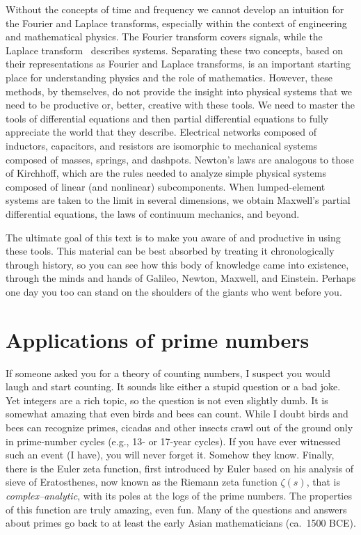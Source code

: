 \documentclass{ximera}
\begin{document}
Without the concepts of time and frequency we cannot develop an intuition for the Fourier and Laplace
transforms, especially within the context of engineering and mathematical physics.
The Fourier transform covers signals, while the Laplace transform \LT\ describes systems. Separating these
two concepts, based on their representations as Fourier and Laplace transforms, is an important
starting place for understanding physics and the role of mathematics. However, these methods, by
themselves, do not provide the insight into physical systems that we need to be productive or, better,
creative with these tools. We need to master the tools of differential equations and then partial
differential equations to fully appreciate the world that they describe. Electrical 
networks composed of inductors, capacitors, and resistors are isomorphic to mechanical systems
composed of masses, springs, and dashpots. Newton's laws are analogous to those of Kirchhoff,
which are the rules needed to analyze simple physical systems composed of linear (and nonlinear)
subcomponents. When lumped-element systems are taken to the limit in several dimensions, we obtain
Maxwell's partial differential equations, the laws of continuum mechanics, and beyond.

The ultimate goal of this text is to make you aware of and productive in using these tools.
This material can be best absorbed by treating it chronologically through history, so you
can see how this body of knowledge came into existence, through the minds and hands of Galileo,
Newton, Maxwell, and Einstein. Perhaps one day you too can stand on the shoulders of the giants who
went before you.

\section {Applications of prime numbers \label{Lec 4}}

If someone asked you for a theory of counting numbers, I suspect you would laugh and start counting.
It sounds like either a stupid question or a bad joke.  Yet integers are a rich topic, so the question
is not even slightly dumb.
It is somewhat amazing that even birds and bees can count.  While I doubt birds and bees can recognize
primes, cicadas and other insects crawl out of the ground only in prime-number cycles (e.g., 13- or
17-year cycles). If you have ever witnessed such an event (I have), you will never forget it. 
Somehow they know.  Finally, there is the Euler zeta function, first introduced by Euler based on his
analysis of sieve of Eratosthenes, now known as the Riemann zeta function $\zeta(s)$, that is
\emph{complex--analytic}, with its poles at the logs of the prime numbers. 
The properties of this function are truly amazing, even fun.
Many of the questions and answers about primes go back to at least the early Asian
mathematicians (ca.~1500 BCE).
\end{document}
